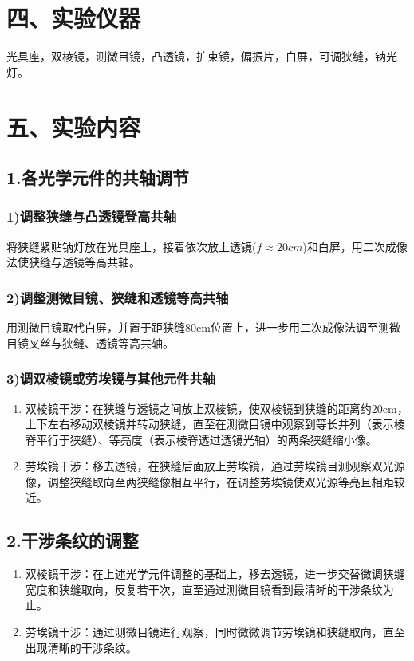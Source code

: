 \documentclass[11pt,a4paper,oneside]{article}
\begin{document}
\section*{四、实验仪器}
   光具座，双棱镜，测微目镜，凸透镜，扩束镜，偏振片，白屏，可调狭缝，钠光灯。
   
\section*{五、实验内容}

\subsection*{1.各光学元件的共轴调节}
\subsubsection*{1)调整狭缝与凸透镜登高共轴}
将狭缝紧贴钠灯放在光具座上，接着依次放上透镜($f\approx 20cm$)和白屏，用二次成像法使狭缝与透镜等高共轴。
\subsubsection*{2)调整测微目镜、狭缝和透镜等高共轴}
用测微目镜取代白屏，并置于距狭缝80cm位置上，进一步用二次成像法调至测微目镜叉丝与狭缝、透镜等高共轴。
\subsubsection*{3)调双棱镜或劳埃镜与其他元件共轴}
\begin{enumerate}
\item 双棱镜干涉：在狭缝与透镜之间放上双棱镜，使双棱镜到狭缝的距离约20cm，上下左右移动双棱镜并转动狭缝，直至在测微目镜中观察到等长并列（表示棱脊平行于狭缝）、等亮度（表示棱脊透过透镜光轴）的两条狭缝缩小像。
\item 劳埃镜干涉：移去透镜，在狭缝后面放上劳埃镜，通过劳埃镜目测观察双光源像，调整狭缝取向至两狭缝像相互平行，在调整劳埃镜使双光源等亮且相距较近。
\end{enumerate}

\subsection*{2.干涉条纹的调整}
\begin{enumerate}
\item 双棱镜干涉：在上述光学元件调整的基础上，移去透镜，进一步交替微调狭缝宽度和狭缝取向，反复若干次，直至通过测微目镜看到最清晰的干涉条纹为止。
\item 劳埃镜干涉：通过测微目镜进行观察，同时微微调节劳埃镜和狭缝取向，直至出现清晰的干涉条纹。
\end{enumerate}
\end{document}
